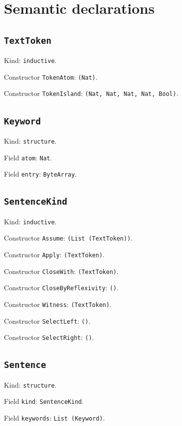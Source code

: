 \documentclass[11pt]{article}
\begin{document}
\section*{Semantic declarations}
\subsection*{\texttt{TextToken}}
\noindent Kind: \texttt{inductive}.\par
\noindent Constructor \texttt{TokenAtom}: \texttt{(Nat)}.\par
\noindent Constructor \texttt{TokenIsland}: \texttt{(Nat, Nat, Nat, Nat, Bool)}.\par
\subsection*{\texttt{Keyword}}
\noindent Kind: \texttt{structure}.\par
\noindent Field \texttt{atom}: \texttt{Nat}.\par
\noindent Field \texttt{entry}: \texttt{ByteArray}.\par
\subsection*{\texttt{SentenceKind}}
\noindent Kind: \texttt{inductive}.\par
\noindent Constructor \texttt{Assume}: \texttt{(List (TextToken))}.\par
\noindent Constructor \texttt{Apply}: \texttt{(TextToken)}.\par
\noindent Constructor \texttt{CloseWith}: \texttt{(TextToken)}.\par
\noindent Constructor \texttt{CloseByReflexivity}: \texttt{()}.\par
\noindent Constructor \texttt{Witness}: \texttt{(TextToken)}.\par
\noindent Constructor \texttt{SelectLeft}: \texttt{()}.\par
\noindent Constructor \texttt{SelectRight}: \texttt{()}.\par
\subsection*{\texttt{Sentence}}
\noindent Kind: \texttt{structure}.\par
\noindent Field \texttt{kind}: \texttt{SentenceKind}.\par
\noindent Field \texttt{keywords}: \texttt{List (Keyword)}.\par
\end{document}
